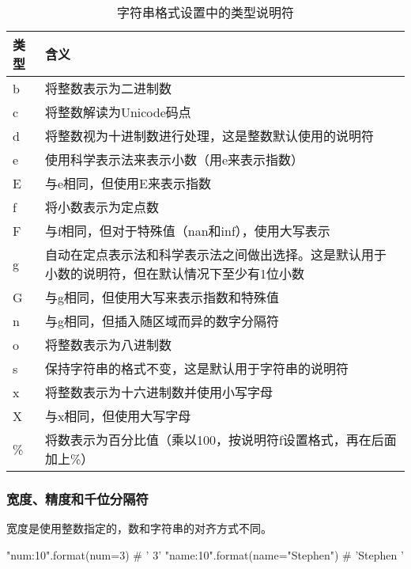 \begin{table}
    \caption{字符串格式设置中的类型说明符}
    \label{StringFormatTypeDescription}
    \begin{tabularx}{\textwidth}{lX}
        \hline
        类型 & 含义                                               \\
        \hline
        b  & 将整数表示为二进制数                                       \\
        c  & 将整数解读为Unicode码点                                  \\
        d  & 将整数视为十进制数进行处理，这是整数默认使用的说明符                       \\
        e  & 使用科学表示法来表示小数（用e来表示指数）                            \\
        E  & 与e相同，但使用E来表示指数                                   \\
        f  & 将小数表示为定点数                                        \\
        F  & 与f相同，但对于特殊值（nan和inf），使用大写表示                      \\
        g  & 自动在定点表示法和科学表示法之间做出选择。这是默认用于小数的说明符，但在默认情况下至少有1位小数 \\
        G  & 与g相同，但使用大写来表示指数和特殊值                              \\
        n  & 与g相同，但插入随区域而异的数字分隔符                              \\
        o  & 将整数表示为八进制数                                       \\
        s  & 保持字符串的格式不变，这是默认用于字符串的说明符                         \\
        x  & 将整数表示为十六进制数并使用小写字母                               \\
        X  & 与x相同，但使用大写字母                                     \\
        \% & 将数表示为百分比值（乘以100，按说明符f设置格式，再在后面加上\%）              \\
        \hline
    \end{tabularx}
\end{table}

\subsubsection{宽度、精度和千位分隔符}
宽度是使用整数指定的，数和字符串的对齐方式不同。
\begin{pyc}
"{num:10}".format(num=3)
# '         3'
"{name:10}".format(name="Stephen")
# 'Stephen   '
\end{pyc}

